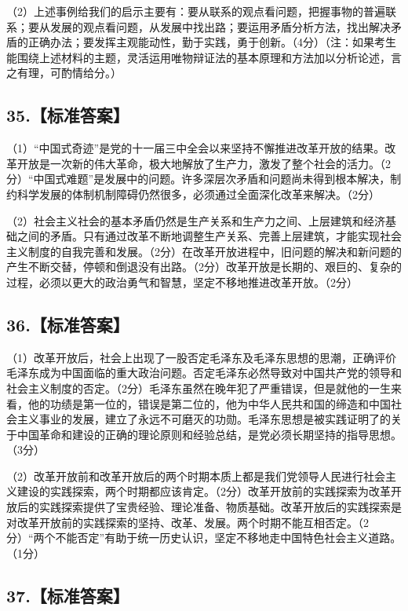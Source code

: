 \documentclass[UTF8,11pt]{ctexart}
\begin{document}
（2）上述事例给我们的启示主要有：要从联系的观点看问题，把握事物的普遍联系；要从发展的观点看问题，从发展中找出路；要运用矛盾分析方法，找出解决矛盾的正确办法；要发挥主观能动性，勤于实践，勇于创新。（4分）（注：如果考生能围绕上述材料的主题，灵活运用唯物辩证法的基本原理和方法加以分析论述，言之有理，可酌情给分。）


\subsection*{35.【标准答案】}

（1）“中国式奇迹”是党的十一届三中全会以来坚持不懈推进改革开放的结果。改革开放是一次新的伟大革命，极大地解放了生产力，激发了整个社会的活力。（2分）“中国式难题”是发展中的问题。许多深层次矛盾和问题尚未得到根本解决，制约科学发展的体制机制障碍仍然很多，必须通过全面深化改革来解决。（2分）


（2）社会主义社会的基本矛盾仍然是生产关系和生产力之间、上层建筑和经济基础之间的矛盾。只有通过改革不断地调整生产关系、完善上层建筑，才能实现社会主义制度的自我完善和发展。（2分）在改革开放进程中，旧问题的解决和新问题的产生不断交替，停顿和倒退没有出路。（2分）改革开放是长期的、艰巨的、复杂的过程，必须以更大的政治勇气和智慧，坚定不移地推进改革开放。（2分）


\subsection*{36.【标准答案】}

（1）改革开放后，社会上出现了一股否定毛泽东及毛泽东思想的思潮，正确评价毛泽东成为中国面临的重大政治问题。否定毛泽东必然导致对中国共产党的领导和社会主义制度的否定。（2分）毛泽东虽然在晚年犯了严重错误，但是就他的一生来看，他的功绩是第一位的，错误是第二位的，他为中华人民共和国的缔造和中国社会主义事业的发展，建立了永远不可磨灭的功勋。毛泽东思想是被实践证明了的关于中国革命和建设的正确的理论原则和经验总结，是党必须长期坚持的指导思想。（3分）


（2）改革开放前和改革开放后的两个时期本质上都是我们党领导人民进行社会主义建设的实践探索，两个时期都应该肯定。（2分）改革开放前的实践探索为改革开放后的实践探索提供了宝贵经验、理论准备、物质基础。改革开放后的实践探索是对改革开放前的实践探索的坚持、改革、发展。两个时期不能互相否定。（2分）“两个不能否定”有助于统一历史认识，坚定不移地走中国特色社会主义道路。（1分）


\subsection*{37.【标准答案】}
\end{document}

